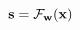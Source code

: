 \vspace{-0.1cm}
\begin{equation}
    \mathbf{s} = \mathcal{F}_\mathbf{w}(\mathbf{x})
    \label{eq:forward-pass}
    \vspace{-0.05cm}
\end{equation}